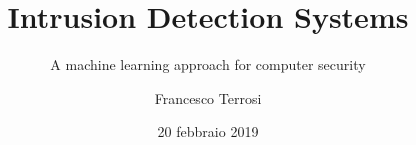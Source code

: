 \documentclass[]{beamer}%
\author{Francesco Terrosi}
\title{Intrusion Detection Systems}
\subtitle{A machine learning approach for computer security}
\institute[UniFi]{Università degli studi di Firenze}
\date{20 febbraio 2019}
\begin{document}
	
	{\logo{}
	\maketitle}
	
	
	
	
\end{document}

